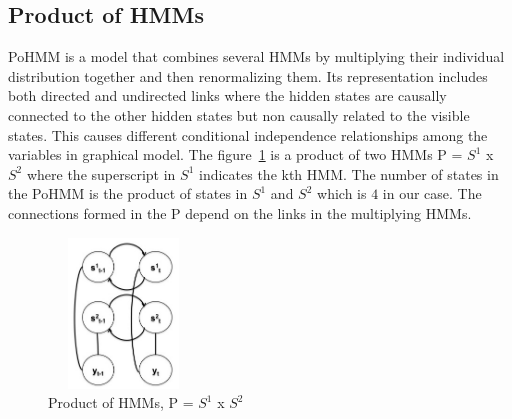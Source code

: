 \documentclass[conference]{IEEEtran}
\begin{document}

\subsection{Product of HMMs}
\label {sec:pohmm}
PoHMM is a model that combines several HMMs by multiplying their individual distribution together and then renormalizing them. Its representation includes both directed and undirected links where the hidden states are causally connected to the other hidden states but non causally related to the visible states. This causes different conditional independence relationships among the variables in graphical model. 
The figure~\ref{fig:product} is a product of two HMMs P = $S^1$ x $S^2$ where the superscript in $S^1$ indicates the kth HMM. The number of states in the PoHMM is the product of states in $S^1$ and $S^2$ which is $4$ in our case. The connections formed in the P depend on the links in the multiplying HMMs. 



 \begin{figure}[!t]
\centering
\includegraphics[width=4cm,height=4cm]{product}
\caption{Product of HMMs, P = $S^{1}$ x $S^2$}
\label{fig:product}
\end{figure}
\end{document}
